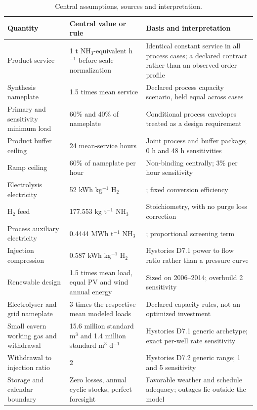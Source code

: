 
\begin{table}[H]
\caption{Central assumptions, sources and interpretation.\label{tab:assumptions}}
{\small
\begin{tabularx}{\textwidth}{@{}J{0.85} J{0.90} J{1.25}@{}}
\toprule
\textbf{Quantity} & \textbf{Central value or rule} & \textbf{Basis and interpretation}\\
\midrule
Product service & 1 t NH$_3$-equivalent h$^{-1}$ before scale normalization & Identical constant service in all process cases; a declared contract rather than an observed order profile\\
Synthesis nameplate & 1.5 times mean service & Declared process capacity scenario, held equal across cases\\
Primary and sensitivity minimum load & 60\% and 40\% of nameplate & Conditional process envelopes treated as a design requirement\\
Product buffer ceiling & 24 mean-service hours & Joint process and buffer package; 0 h and 48 h sensitivities\\
Ramp ceiling & 60\% of nameplate per hour & Non-binding centrally; 3\% per hour sensitivity\\
Electrolysis electricity & 52 kWh kg$^{-1}$ H$_2$ & \citet{irena2022}; fixed conversion efficiency\\
H$_2$ feed & 177.553 kg t$^{-1}$ NH$_3$ & Stoichiometry, with no purge loss correction\\
Process auxiliary electricity & 0.4444 MWh t$^{-1}$ NH$_3$ & \citet{smith2025}; proportional screening term\\
Injection compression & 0.587 kWh kg$^{-1}$ H$_2$ & Hystories D7.1 power to flow ratio rather than a pressure curve\\
Renewable design & 1.5 times mean load, equal PV and wind annual energy & Sized on 2006--2014; overbuild 2 sensitivity\\
Electrolyser and grid nameplate & 3 times the respective mean modeled loads & Declared capacity rules, not an optimized investment\\
Small cavern working gas and withdrawal & 15.6 million standard m$^3$ and 1.4 million standard m$^3$ d$^{-1}$ & Hystories D7.1 generic archetype; exact per-well rate sensitivity\\
Withdrawal to injection ratio & 2 & Hystories D7.2 generic range; 1 and 5 sensitivity\\
Storage and calendar boundary & Zero losses, annual cyclic stocks, perfect foresight & Favorable weather and schedule adequacy; outages lie outside the model\\
\bottomrule
\end{tabularx}}
\end{table}

